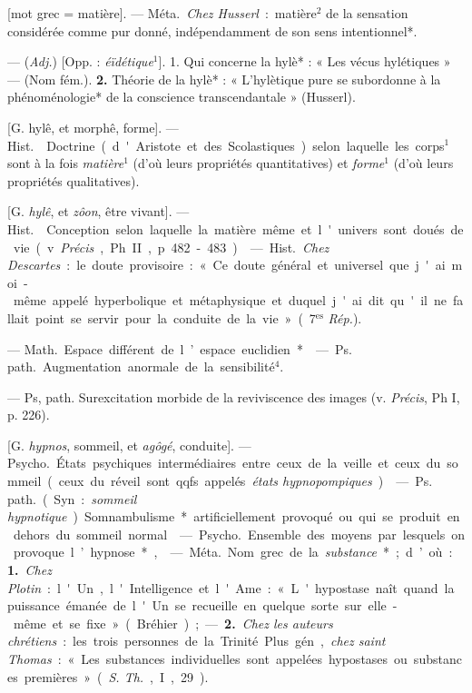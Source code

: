 \begin{itemize}[leftmargin=1cm, label=, itemsep=1pt]
 [mot grec = matière]. — \si{Méta.}
{\it Chez Husserl} : matière$^2$ de la sensation considérée comme pur donné,
indépendamment de son sens intentionnel*.

 — ({\it Adj.}) [Opp. : {\it éïdétique}$^1$]. 1. Qui concerne
la hylè* : « Les vécus hylétiques » — (Nom fém.). {\bf 2.} Théorie de la
hylè* : « L’hylètique pure se subordonne à la phénoménologie* de la
conscience transcendantale » (Husserl).

 [G. hylê, et morphê, forme]. — \si{Hist.} 
Doctrine (d'Aristote et des Scolastiques) selon laquelle les corps$^1$ sont à
la fois {\it matière}$^1$ (d’où leurs propriétés quantitatives) et
{\it forme}$^1$ (d’où leurs propriétés qualitatives).

 [G. {\it hylê}, et {\it zôon}, être vivant]. — \si{Hist.}
 Conception selon laquelle la matière même et l'univers sont
doués de vie (v. {\it Précis}, Ph. II, p. 482-483).

 — \si{Hist.} {\it Chez Descartes} : le doute
provisoire : « Ce doute général et universel que j'ai moi-même appelé
hyperbolique et métaphysique et duquel j'ai dit qu'il ne fallait point se
servir pour... la conduite de la vie » (7$^\text{es}$ {\it Rép.}).

 — \si{Math.} Espace différent de l’espace euclidien*.

 — \si{Ps. path.} Augmentation anormale de la 
sensibilité$^4$.

 — Ps, path. Surexcitation morbide de la reviviscence
des images (v. {\it Précis}, Ph I, p. 226).

 [G. {\it hypnos}, sommeil, et {\it agôgé},
conduite]. — \si{Psycho.} États psychiques intermédiaires entre ceux de la
veille et ceux du sommeil (ceux du réveil sont qqfs. appelés {\it états
hypnopompiques}).

 — \si{Ps. path.} (Syn. : {\it sommeil hypnotique}).
Somnambulisme* artificiellement provoqué ou qui se produit en dehors du
sommeil normal.

 — \si{Psycho.} Ensemble
des moyens par lesquels on provoque l’hypnose*,

 — \si{Méta.} Nom grec de la {\it substance}* ; d’où : {\bf 1.}
{\it Chez Plotin} : l'Un, l'Intelligence et l'Ame : « L'hypostase naît quand
la puissance émanée de l'Un se recueille en quelque sorte sur elle-même et se
fixe » (Bréhier) ; — {\bf 2.} {\it Chez les auteurs chrétiens} : les trois
personnes de la Trinité. Plus gén., {\it chez saint Thomas} : « Les
substances individuelles sont appelées hypostases ou substances
premières » ({\it S. Th.}, I, 29).


\end{itemize}
